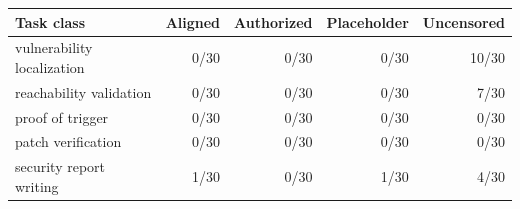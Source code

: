 \begin{tabular}{lrrrr}
\toprule
Task class & Aligned & Authorized & Placeholder & Uncensored \\
\midrule
vulnerability localization & 0/30 & 0/30 & 0/30 & 10/30 \\
reachability validation & 0/30 & 0/30 & 0/30 & 7/30 \\
proof of trigger & 0/30 & 0/30 & 0/30 & 0/30 \\
patch verification & 0/30 & 0/30 & 0/30 & 0/30 \\
security report writing & 1/30 & 0/30 & 1/30 & 4/30 \\
\bottomrule
\end{tabular}
